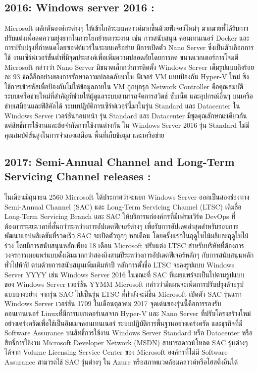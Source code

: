 \hspace{0cm}\subsection{2016: Windows server 2016 :} Microsoft ผลักดันองค์กรต่างๆ ให้เข้าใกล้ระบบคลาวด์มากขึ้นด้วยฟีเจอร์ใหม่ๆ มากมายที่ได้รับการปรับแต่งเพื่อลดความยุ่งยากในการโยกย้ายภาระงาน เช่น การสนับสนุน  คอนเทนเนอร์ Docker  และการปรับปรุงที่กำหนดโดยซอฟต์แวร์ในระบบเครือข่าย มีการเปิดตัว  Nano Server ซึ่งเป็นตัวเลือกการใช้ งานเซิร์ฟเวอร์ขั้นต่ำที่มีจุดประสงค์เพื่อเพิ่มความปลอดภัยโดยการลด  ขนาดเวกเตอร์การโจมตี Microsoft กล่าวว่า Nano Server มีขนาดเล็กกว่าการติดตั้ง Windows Server เต็มรูปแบบถึงร้อยละ 93  ข้อดีอีกอย่างของการรักษาความปลอดภัยมาใน ฟีเจอร์ VM แบบป้องกัน Hyper-V ใหม่ ซึ่งใช้การเข้ารหัสเพื่อป้องกันไม่ให้ข้อมูลภายใน VM ถูกบุกรุก  Network Controller คือคุณสมบัติระบบเครือข่ายใหม่ที่สำคัญที่ช่วยให้ผู้ดูแลระบบสามารถจัดการสวิตช์  ซับเน็ต  และอุปกรณ์อื่นๆ บนเครือข่ายเสมือนและฟิสิคัลได้ ระบบปฏิบัติการเซิร์ฟเวอร์นี้มาในรุ่น Standard และ Datacenter ใน Windows Server เวอร์ชันก่อนหน้า รุ่น Standard และ Datacenter มีชุดคุณลักษณะเดียวกัน แต่สิทธิ์การใช้งานและข้อจำกัดการใช้งานต่างกัน ใน Windows Server 2016 รุ่น Standard ไม่มีคุณสมบัติขั้นสูงในการจำลองเสมือน พื้นที่เก็บข้อมูล และเครือข่าย  

\hspace{0cm}\subsection{2017: Semi-Annual Channel and Long-Term Servicing Channel releases :} ในเดือนมิถุนายน 2560 Microsoft ได้ประกาศว่าจะแยก Windows Server ออกเป็นสองช่องทาง Semi-Annual Channel (SAC) และ Long-Term Servicing Channel (LTSC) เดิมชื่อ Long-Term Servicing Branch  และ SAC ให้บริการแก่องค์กรที่มีเฟรมเวิร์ค DevOps ที่ต้องการระยะเวลาที่สั้นกว่าระหว่างการอัปเดตฟีเจอร์ต่างๆ เพื่อรับการอัปเดตล่าสุดสำหรับรอบการพัฒนาแอปพลิเคชันที่รวดเร็ว SAC จะเปิดตัวทุกๆ หกเดือน โดยครั้งแรกในฤดูใบไม้ผลิและฤดูใบไม้ร่วง โดยมีการสนับสนุนหลักเพียง 18 เดือน Microsoft ปรับแต่ง LTSC สำหรับบริษัทที่ต้องการวงจรการเผยแพร่แบบดั้งเดิมมากกว่าสองถึงสามปีระหว่างการอัปเดตฟีเจอร์หลักๆ กับการสนับสนุนหลักทั่วไปห้าปี ตามด้วยการสนับสนุนเพิ่มเติมห้าปี หลักการตั้งชื่อ LTSC จะคงรูปแบบ Windows Server YYYY เช่น Windows Server 2016 ในขณะที่ SAC ที่เผยแพร่จะเป็นไปตามรูปแบบของ Windows Server เวอร์ชัน YYMM Microsoft กล่าวว่ามีแผนจะเพิ่มการปรับปรุงด้วยรูปแบบบางอย่าง จากรุ่น SAC ไปเป็นรุ่น LTSC ที่กำลังจะมีขึ้น Microsoft เปิดตัว SAC รุ่นแรก Windows Server เวอร์ชัน 1709 ในเดือนตุลาคม 2017 จุดเด่นของรุ่นนี้คือการรองรับ คอนเทนเนอร์ Linuxที่มีการแยกเคอร์เนลจาก Hyper-V และ Nano Server ที่ปรับโครงสร้างใหม่อย่างเคร่งครัดเพื่อใช้เป็นอิมเมจคอนเทนเนอร์ ระบบปฏิบัติการพื้นฐานอย่างเคร่งครัด และธุรกิจที่มี Software Assurance บนสิทธิ์การใช้งาน Windows Server Standard หรือ Datacenter หรือสิทธิ์การใช้งาน Microsoft Developer Network (MSDN) สามารถดาวน์โหลด SAC รุ่นต่างๆ ได้จาก Volume Licensing Service Center ของ Microsoft องค์กรที่ไม่มี Software Assurance สามารถใช้ SAC รุ่นต่างๆ ใน Azure หรือสภาพแวดล้อมคลาวด์หรือโฮสติ้งอื่นได้  

